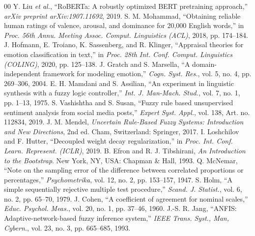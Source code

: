 \documentclass[conference, a4paper]{IEEEtran}
\begin{document}
\begin{thebibliography}{00}
 Y. Liu \textit{et al.}, ``RoBERTa: A robustly optimized BERT pretraining approach,'' \textit{arXiv preprint arXiv:1907.11692}, 2019.
 S. M. Mohammad, ``Obtaining reliable human ratings of valence, arousal, and dominance for 20,000 English words,'' in \textit{Proc. 56th Annu. Meeting Assoc. Comput. Linguistics (ACL)}, 2018, pp. 174--184.
 J. Hofmann, E. Troiano, K. Sassenberg, and R. Klinger, ``Appraisal theories for emotion classification in text,'' in \textit{Proc. 28th Int. Conf. Comput. Linguistics (COLING)}, 2020, pp. 125--138.
 J. Gratch and S. Marsella, ``A domain-independent framework for modeling emotion,'' \textit{Cogn. Syst. Res.}, vol. 5, no. 4, pp. 269--306, 2004.
 E. H. Mamdani and S. Assilian, ``An experiment in linguistic synthesis with a fuzzy logic controller,'' \textit{Int. J. Man-Mach. Stud.}, vol. 7, no. 1, pp. 1--13, 1975.
 S. Vashishtha and S. Susan, ``Fuzzy rule based unsupervised sentiment analysis from social media posts,'' \textit{Expert Syst. Appl.}, vol. 138, Art. no. 112834, 2019.
 J. M. Mendel, \textit{Uncertain Rule-Based Fuzzy Systems: Introduction and New Directions}, 2nd ed. Cham, Switzerland: Springer, 2017.
 I. Loshchilov and F. Hutter, ``Decoupled weight decay regularization,'' in \textit{Proc. Int. Conf. Learn. Represent. (ICLR)}, 2019.
 B. Efron and R. J. Tibshirani, \textit{An Introduction to the Bootstrap}. New York, NY, USA: Chapman \& Hall, 1993.
 Q. McNemar, ``Note on the sampling error of the difference between correlated proportions or percentages,'' \textit{Psychometrika}, vol. 12, no. 2, pp. 153--157, 1947.
 S. Holm, ``A simple sequentially rejective multiple test procedure,'' \textit{Scand. J. Statist.}, vol. 6, no. 2, pp. 65--70, 1979.
 J. Cohen, ``A coefficient of agreement for nominal scales,'' \textit{Educ. Psychol. Meas.}, vol. 20, no. 1, pp. 37--46, 1960.
 J.-S. R. Jang, ``ANFIS: Adaptive-network-based fuzzy inference system,'' \textit{IEEE Trans. Syst., Man, Cybern.}, vol. 23, no. 3, pp. 665--685, 1993.
\end{thebibliography}
\end{document}
